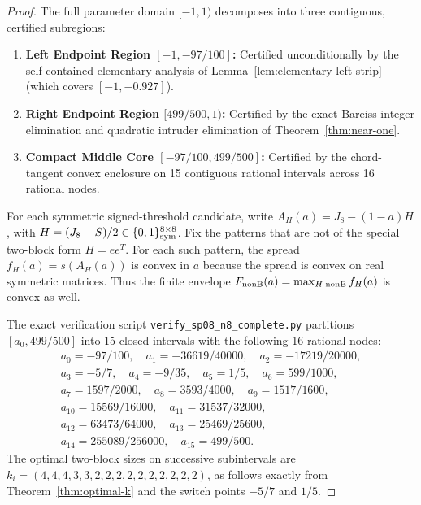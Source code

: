 \documentclass[11pt,reqno]{article}
\theoremstyle{definition}
\begin{document}
\begin{proof}
The full parameter domain $[-1, 1)$ decomposes into three contiguous, certified subregions:
\begin{enumerate}
    \item \textbf{Left Endpoint Region $[-1, -97/100]$:} Certified unconditionally by the self-contained elementary analysis of Lemma~\ref{lem:elementary-left-strip} (which covers $[-1, -0.927]$).
    \item \textbf{Right Endpoint Region $[499/500, 1)$:} Certified by the exact Bareiss integer elimination and quadratic intruder elimination of Theorem~\ref{thm:near-one}.
    \item \textbf{Compact Middle Core $[-97/100, 499/500]$:} Certified by the chord-tangent convex enclosure on 15 contiguous rational intervals across 16 rational nodes.
\end{enumerate}

For each symmetric signed-threshold candidate, write $A_H(a)=J_8-(1-a)H$,
with $H=(J_8-S)/2\in\{0,1\}_{\rm sym}^{8\times8}$.
Fix the patterns that are not of the special two-block form $H=ee^T$.
For each such pattern, the spread $f_H(a)=s(A_H(a))$ is convex in $a$
because the spread is convex on real symmetric matrices. Thus the finite
envelope $F_{\rm nonB}(a)=\max_{H\;\rm nonB}f_H(a)$ is convex as well.

The exact verification script \texttt{verify\_sp08\_n8\_complete.py} partitions
$[a_0,499/500]$ into 15 closed intervals with the following 16 rational nodes:
\[
\begin{gathered}
a_0=-97/100,\quad a_1=-36619/40000,\quad a_2=-17219/20000,\\
a_3=-5/7,\quad a_4=-9/35,\quad a_5=1/5,\quad a_6=599/1000,\\
a_7=1597/2000,\quad a_8=3593/4000,\quad a_9=1517/1600,\\
a_{10}=15569/16000,\quad a_{11}=31537/32000,\\
a_{12}=63473/64000,\quad a_{13}=25469/25600,\\
a_{14}=255089/256000,\quad a_{15}=499/500.
\end{gathered}
\]
The optimal two-block sizes on successive subintervals are
$k_i=(4,4,4,3,3,2,2,2,2,2,2,2,2,2,2)$, as follows exactly from
Theorem~\ref{thm:optimal-k} and the switch points $-5/7$ and $1/5$.


\end{proof}
\end{document}
